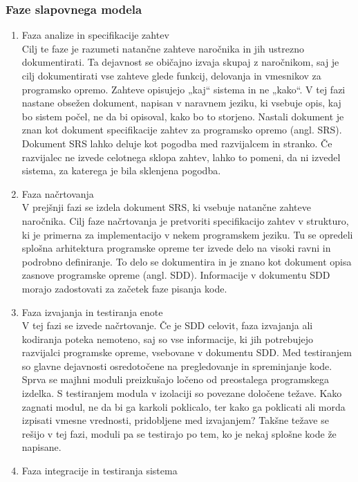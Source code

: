 \documentclass[a4paper,12pt,openright]{book}
\begin{document}
\subsubsection{Faze slapovnega modela}
\begin{enumerate}
    \item Faza analize in specifikacije zahtev \\
    Cilj te faze je razumeti natančne zahteve naročnika in jih ustrezno dokumentirati. Ta dejavnost se običajno izvaja skupaj z naročnikom, saj je cilj dokumentirati vse zahteve glede funkcij, delovanja in vmesnikov za programsko opremo. Zahteve opisujejo „kaj“ sistema in ne „kako“. V tej fazi nastane obsežen dokument, napisan v naravnem jeziku, ki vsebuje opis, kaj bo sistem počel, ne da bi opisoval, kako bo to storjeno. Nastali dokument je znan kot dokument specifikacije zahtev za programsko opremo (angl. SRS). Dokument SRS lahko deluje kot pogodba med razvijalcem in stranko. Če razvijalec ne izvede celotnega sklopa zahtev, lahko to pomeni, da ni izvedel sistema, za katerega je bila sklenjena pogodba.
    \item Faza načrtovanja \\
     V prejšnji fazi se izdela dokument SRS, ki vsebuje natančne zahteve naročnika. Cilj faze načrtovanja je pretvoriti specifikacijo zahtev v strukturo, ki je primerna za implementacijo v nekem programskem jeziku. Tu se opredeli splošna arhitektura programske opreme ter izvede delo na visoki ravni in podrobno deﬁniranje. To delo se dokumentira in je znano kot dokument opisa zasnove programske opreme (angl. SDD). Informacije v dokumentu SDD morajo zadostovati za začetek faze pisanja kode.
    \item Faza izvajanja in testiranja enote \\
    V tej fazi se izvede načrtovanje. Če je SDD celovit, faza izvajanja ali kodiranja poteka nemoteno, saj so vse informacije, ki jih potrebujejo razvijalci programske opreme, vsebovane v dokumentu SDD.
Med testiranjem so glavne dejavnosti osredotočene na pregledovanje in spreminjanje kode. Sprva se majhni moduli preizkušajo ločeno od preostalega programskega izdelka. S testiranjem modula v izolaciji so povezane določene težave. Kako zagnati modul, ne da bi ga karkoli poklicalo, ter kako ga poklicati ali morda izpisati vmesne vrednosti, pridobljene med izvajanjem? Takšne težave se rešijo v tej fazi, moduli pa se testirajo po tem, ko je nekaj splošne kode že napisane.
    \item Faza integracije in testiranja sistema \\

\end{enumerate}
\end{document}

